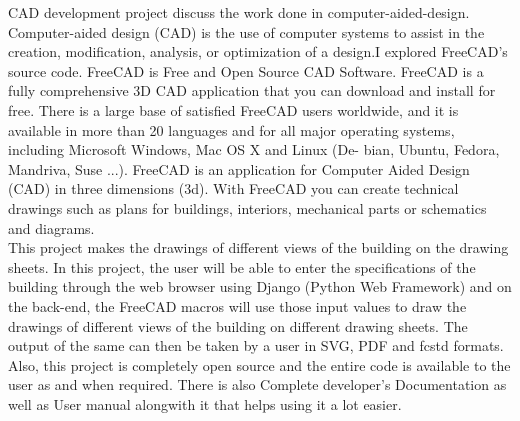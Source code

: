 \begin{Large}
\end{Large}

CAD development project discuss the work done in computer-aided-design. Computer-aided design (CAD) is the use of computer systems to assist in the creation, modification, analysis, or optimization of a design.I explored FreeCAD’s source code. FreeCAD is Free and Open Source CAD Software. FreeCAD
is a fully comprehensive 3D CAD application that you can download and install for free. There is
a large base of satisfied FreeCAD users worldwide, and it is available in more than 20 languages
and for all major operating systems, including Microsoft Windows, Mac OS X and Linux (De-
bian, Ubuntu, Fedora, Mandriva, Suse ...). FreeCAD is an application for Computer Aided Design
(CAD) in three dimensions (3d). With FreeCAD you can create technical drawings such as plans
for buildings, interiors, mechanical parts or schematics and diagrams.\\

This project makes the drawings of different views of the building on the drawing sheets.
In this project, the user will be able to enter the specifications of the building through the web
browser using Django (Python Web Framework) and on the back-end, the FreeCAD macros will
use those input values to draw the drawings of different views of the building on different drawing
sheets. The output of the same can then be taken by a user in SVG, PDF and fcstd formats.\\

Also, this project is completely open source and the entire code is available 
to the user as and when required. There is also Complete developer's 
Documentation as well as User manual alongwith it that helps using it a lot easier.
